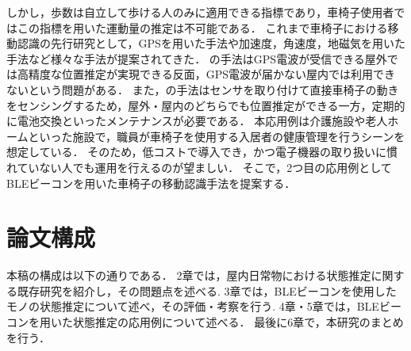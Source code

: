 しかし，歩数は自立して歩ける人のみに適用できる指標であり，車椅子使用者ではこの指標を用いた運動量の推定は不可能である．
これまで車椅子における移動認識の先行研究として，GPSを用いた手法\cite{gps}や加速度，角速度，地磁気を用いた手法\cite{baske}など様々な手法が提案されてきた．
\cite{gps}の手法はGPS電波が受信できる屋外では高精度な位置推定が実現できる反面，GPS電波が届かない屋内では利用できないという問題がある．
また，\cite{baske}の手法はセンサを取り付けて直接車椅子の動きをセンシングするため，屋外・屋内のどちらでも位置推定ができる一方，定期的に電池交換といったメンテナンスが必要である．
本応用例は介護施設や老人ホームといった施設で，職員が車椅子を使用する入居者の健康管理を行うシーンを想定している．
そのため，低コストで導入でき，かつ電子機器の取り扱いに慣れていない人でも運用を行えるのが望ましい．
そこで，2つ目の応用例としてBLEビーコンを用いた車椅子の移動認識手法を提案する．

\section{論文構成}
本稿の構成は以下の通りである．
2章では，屋内日常物における状態推定に関する既存研究を紹介し，その問題点を述べる.
3章では，BLEビーコンを使用したモノの状態推定について述べ，その評価・考察を行う.
4章・5章では，BLEビーコンを用いた状態推定の応用例について述べる．
最後に6章で，本研究のまとめを行う．